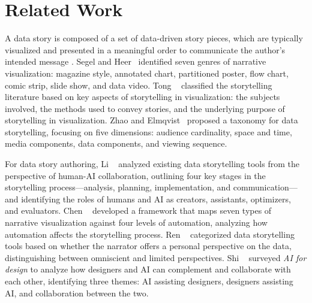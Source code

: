 \section{Related Work}
\label{sec:related}
A data story is composed of a set of data-driven story pieces, which are typically visualized and presented in a meaningful order to communicate the author's intended message \cite{Lee2015, Riche2018}. 
Segel and Heer~\cite{Segel2010} identified seven genres of narrative visualization: magazine style, annotated chart, partitioned poster, flow chart, comic strip, slide show, and data video. 
Tong \etal~\cite{Tong2018} classified the storytelling literature based on key aspects of storytelling in visualization: the subjects involved, the methods used to convey stories, and the underlying purpose of storytelling in visualization.
Zhao and Elmqvist~\cite{Zhao2023a} proposed a taxonomy for data storytelling, focusing on five dimensions: audience cardinality, space and time, media components, data components, and viewing sequence.

For data story authoring, 
Li \etal~\cite{Li2023c} analyzed existing data storytelling tools from the perspective of human-AI collaboration, outlining four key stages in the storytelling process—analysis, planning, implementation, and communication—and identifying the roles of humans and AI as creators, assistants, optimizers, and evaluators. 
Chen \etal~\cite{Chen2022} developed a framework that maps seven types of narrative visualization against four levels of automation, analyzing how automation affects the storytelling process.
Ren \etal~\cite{Ren2023} categorized data storytelling tools based on whether the narrator offers a personal perspective on the data, distinguishing between omniscient and limited perspectives. 
Shi \etal~\cite{Shi2023} surveyed \textit{AI for design} to analyze how designers and AI can complement and collaborate with each other, identifying three themes: AI assisting designers, designers assisting AI, and collaboration between the two. 

